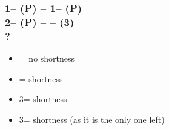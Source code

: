 \documentclass[12pt, a4paper]{article}
\begin{document}
\subsubsection*{1\minor -- (P) -- 1\hearts -- (P)\\
                2\hearts -- (P) -- \alrts{2\spades} -- (3\clubs)\\
                ?}
\begin{itemize}
    \item \pass = no shortness
    \item \dbl = \clubs shortness
    \item 3\diams = \diams shortness
    \item 3\hearts = \spades shortness (as it is the only one left)
\end{itemize}
\end{document}
